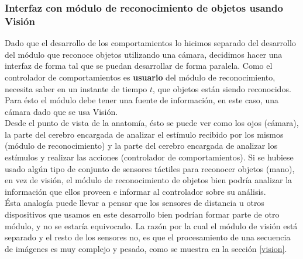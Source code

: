 \subsubsection{Interfaz con m\'odulo de reconocimiento de objetos usando Visi\'on}
Dado que el desarrollo de los comportamientos lo hicimos separado del desarrollo del
m\'odulo que reconoce objetos utilizando una c\'amara, decidimos hacer una interfaz de
forma tal que se puedan desarrollar de forma paralela.
Como el controlador de comportamientos es \textbf{usuario} del m\'odulo de reconocimiento,
necesita saber en un instante de tiempo $t$, que objetos est\'an siendo reconocidos. Para \'esto
el m\'odulo debe tener una fuente de informaci\'on, en este caso, una c\'amara dado que se usa
Visi\'on.
\\
Desde el punto de vista de la anatom\'ia, \'esto se puede ver como los ojos (c\'amara), la parte del cerebro
encargada de analizar el est\'imulo recibido por los mismos (m\'odulo de reconocimiento) y la parte del cerebro
encargada de analizar los est\'imulos y realizar las acciones (controlador de comportamientos). Si se hubiese
usado alg\'un tipo de conjunto de sensores t\'actiles para reconocer objetos (mano), en vez de visi\'on, 
el m\'odulo de reconocimiento de objetos bien podr\'ia analizar la informaci\'on que ellos proveen e
informar al controlador sobre su an\'alisis.
\\
\'Esta analog\'ia puede llevar a pensar que los sensores de distancia u otros dispositivos que usamos
en este desarrollo bien podr\'ian formar parte de otro m\'odulo, y no se estar\'ia equivocado. La raz\'on
por la cual el m\'odulo de visi\'on est\'a separado y el resto de los sensores no, es que el procesamiento
de una secuencia de im\'agenes es muy complejo y pesado, como se muestra en la secci\'on \ref{vision}.

\newpage
